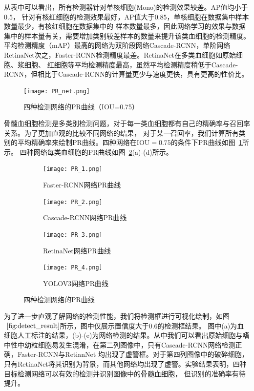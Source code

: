 从表中可以看出，所有检测器针对单核细胞(Mono)的检测效果较差。$\text{AP}$值均小于$0.5$，
针对有核红细胞的检测效果最好，$\text{AP}$值大于$0.85$，单核细胞在数据集中样本数量最少，有核红细胞在数据集中的
样本数量最多，因此网络学习的效果与数据集中的样本量有关，需要增加类别较差样本的数量来提升该类血细胞的检测精度。
平均检测精度（mAP）最高的网络为双阶段网络Cascade-RCNN，单阶网络RetinaNet次之，Faster-RCNN检测精度最差。RetinaNet在多类血细胞如原始细胞、浆细胞、
红细胞等平均检测精度最高，虽然平均检测精度稍低于Cascade-RCNN，但相比于Cascade-RCNN的计算量更少与速度更快，具有更高的性价比。

\begin{figure}[htbp]                     
  \centering                      
  \texttt{[image: PR\_net.png]}                      
  \caption{四种检测网络的PR曲线（IOU=0.75）}                      
  \label{fig:pr_net}       
\end{figure}   

骨髓血细胞检测是多类别检测问题，对于每一类血细胞都有自己的精确率与召回率关系。为了更加直观的比较不同网络的结果，
对于某一召回率，我们计算所有类别的平均精确率来绘制PR曲线。四种网络在$\text{IOU}=0.75$的条件下PR曲线如图~\ref{fig:pr_net}所示。
四种网络每类血细胞的PR曲线如图~\ref{fig:pr_curve}(a)-(d)所示。

\begin{figure}[htbp]
	\centering
  \begin{subfigure}{0.48\linewidth}
    \centering
    \texttt{[image: PR\_1.png]}
    \caption{Faster-RCNN网络PR曲线}
  \end{subfigure}
  \begin{subfigure}{0.48\linewidth}
    \centering
    \texttt{[image: PR\_2.png]}
    \caption{Cascade-RCNN网络PR曲线}
  \end{subfigure}
	\centering
  \begin{subfigure}{0.48\linewidth}
    \centering
    \texttt{[image: PR\_3.png]}
    \caption{RetinaNet网络PR曲线}
  \end{subfigure}
  \centering
  \begin{subfigure}{0.48\linewidth}
    \centering
    \texttt{[image: PR\_4.png]}
    \caption{YOLOV3网络PR曲线}
  \end{subfigure}
	\caption{四种检测网络的PR曲线}
	\label{fig:pr_curve}
\end{figure}

为了进一步直观了解网络的检测性能，我们将检测框进行可视化绘制，如图$~\ref{fig:detect_result}$所示，图中仅展示置信度大于0.6的检测框结果。
图中(a)为血细胞人工标注的结果，(b)-(e)为网络检测的结果。从中我们可以看出原始细胞与嗜中性中幼粒细胞易发生混淆，在第二列图像中，只有Cascade-RCNN网络检测正确，Faster-RCNN与RetianNet
均出现了虚警框。对于第四列图像中的破碎细胞，只有RetinaNet将其识别为背景，而其他网络均出现了虚警。实验结果表明，四种目标检测网络可以有效的检测并识别图像中的骨髓血细胞，
但识别的准确率有待提升。

